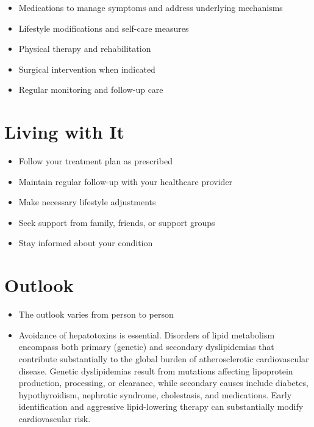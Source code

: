 \begin{itemize}[noitemsep]
  \item Medications to manage symptoms and address underlying mechanisms
  \item Lifestyle modifications and self-care measures
  \item Physical therapy and rehabilitation
  \item Surgical intervention when indicated
  \item Regular monitoring and follow-up care
\end{itemize}
\section{Living with It}
\begin{itemize}[noitemsep]
  \item Follow your treatment plan as prescribed
  \item Maintain regular follow-up with your healthcare provider
  \item Make necessary lifestyle adjustments
  \item Seek support from family, friends, or support groups
  \item Stay informed about your condition
\end{itemize}
\section{Outlook}
\begin{itemize}[noitemsep]
  \item The outlook varies from person to person
  \item Avoidance of hepatotoxins is essential. Disorders of lipid metabolism encompass both primary (genetic) and secondary dyslipidemias that contribute substantially to the global burden of atherosclerotic cardiovascular disease. Genetic dyslipidemias result from mutations affecting lipoprotein production, processing, or clearance, while secondary causes include diabetes, hypothyroidism, nephrotic syndrome, cholestasis, and medications. Early identification and aggressive lipid-lowering therapy can substantially modify cardiovascular risk.
\end{itemize}

